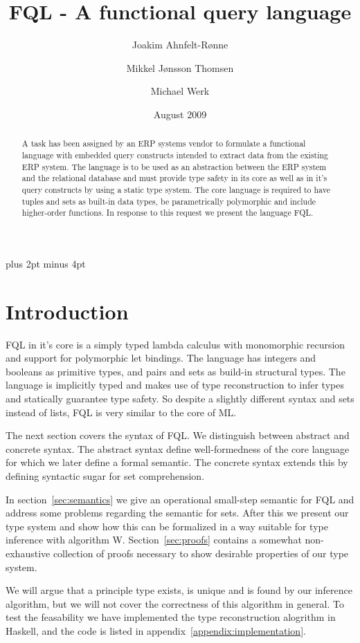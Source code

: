 \documentclass[a4paper]{article}
\title{FQL - A functional query language}
\date{August 2009}
\author{Joakim Ahnfelt-Rønne \and Mikkel Jønsson Thomsen \and Michael Werk}
\begin{document}
\parindent=0pt
\parskip=8pt plus 2pt minus 4pt
\maketitle

\begin{abstract}\noindent
A task has been assigned by an ERP systems vendor to formulate a functional language with embedded query constructs intended to extract data from the existing ERP system. The language is to be used as an abstraction between the ERP system and the relational database and must provide type safety in its core as well as in it's query constructs by using a static type system. The core language is required to have tuples and sets as built-in data types, be parametrically polymorphic and include higher-order functions. In response to this request we present the language FQL.
\end{abstract}


\section{Introduction}

FQL in it's core is a simply typed lambda calculus with monomorphic recursion and support for polymorphic let bindings. The language has integers and booleans as primitive types, and pairs and sets as build-in structural types. The language is implicitly typed and makes use of type reconstruction to infer types and statically guarantee type safety. 
So despite a slightly different syntax and sets instead of lists, FQL is very similar to the core of ML.

The next section covers the syntax of FQL. We distinguish  between abstract and concrete syntax. The abstract syntax define well-formedness of the core language for which we later define a formal semantic. The concrete syntax extends this by defining syntactic sugar for set comprehension.

In section~\ref{sec:semantics} we give an operational small-step semantic for FQL and address some problems regarding the semantic for sets. 
After this we present our type system and show how this can be formalized in a way suitable for type inference with algorithm W. Section~\ref{sec:proofs} contains a somewhat non-exhaustive collection of proofs necessary to show desirable properties of our type system.

We will argue that a principle type exists, is unique and is found by our inference algorithm, but we will not cover the correctness of this algorithm in general. 
To test the feasability we have implemented the type reconstruction alogrithm in Haskell, and the code is listed in appendix~\ref{appendix:implementation}.
\end{document}
